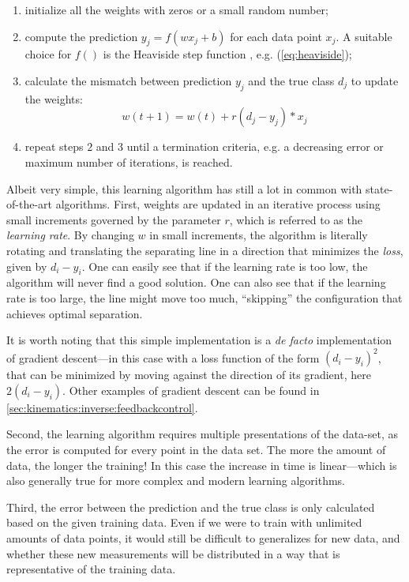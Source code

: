\begin{enumerate}
\item initialize all the weights with zeros or a small random number;
\item compute the prediction $y_j=f(wx_j+b)$ for each data point $x_j$. A suitable choice for $f()$ is the Heaviside step function , e.g. (\cref{eq:heaviside});
\item calculate the mismatch between prediction $y_j$ and the true class $d_j$ to update the weights:
\begin{equation}
w(t+1)=w(t)+r(d_j-y_j)*x_j
\end{equation}
\item repeat steps $2$ and $3$ until a termination criteria, e.g. a decreasing error or maximum number of iterations, is reached.
\end{enumerate}

Albeit very simple, this learning algorithm has still a lot in common with state-of-the-art algorithms. First, weights are updated in an iterative process using small increments governed by the parameter $r$, which is referred to as the \textsl{learning rate}. By changing $w$ in small increments, the algorithm is literally rotating and translating the separating line in a direction that minimizes the \textsl{loss}, given by $d_i-y_i$. One can easily see that if the learning rate is too low, the algorithm will never find a good solution. One can also see that if the learning rate is too large, the line might move too much, ``skipping'' the configuration that achieves optimal separation.

It is worth noting that this simple implementation is a \textsl{de facto} implementation of gradient descent---in this case with a loss function of the form $(d_i-y_i)^2$, that can be minimized by moving against the direction of its gradient, here $2(d_i-y_i)$. Other examples of gradient descent can be found in \cref{sec:kinematics:inverse:feedbackcontrol}.

Second, the learning algorithm requires multiple presentations of the data-set, as the error is computed for every point in the data set. The more the amount of data, the longer the training! In this case the increase in time is linear---which is also generally true for more complex and modern learning algorithms.

Third, the error between the prediction and the true class is only calculated based on the given training data. Even if we were to train with unlimited amounts of data points, it would still be difficult to generalizes for new data, and whether these new measurements will be distributed in a way that is representative of the training data.

